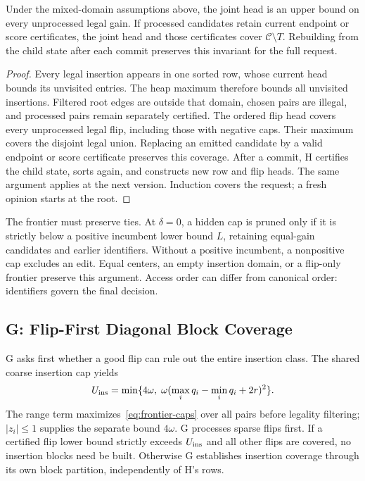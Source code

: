 \begin{theorem}\label{thm:coverage}
Under the mixed-domain assumptions above, the joint head is an upper bound on every unprocessed legal gain. If processed candidates retain current endpoint or score certificates, the joint head and those certificates cover $\mathcal C\setminus T$. Rebuilding from the child state after each commit preserves this invariant for the full request.
\end{theorem}
\begin{proof}
Every legal insertion appears in one sorted row, whose current head bounds its unvisited entries. The heap maximum therefore bounds all unvisited insertions. Filtered root edges are outside that domain, chosen pairs are illegal, and processed pairs remain separately certified. The ordered flip head covers every unprocessed legal flip, including those with negative caps. Their maximum covers the disjoint legal union. Replacing an emitted candidate by a valid endpoint or score certificate preserves this coverage. After a commit, H certifies the child state, sorts again, and constructs new row and flip heads. The same argument applies at the next version. Induction covers the request; a fresh opinion starts at the root.
\end{proof}

The frontier must preserve ties. At $\delta=0$, a hidden cap is pruned only if it is strictly below a positive incumbent lower bound $L$, retaining equal-gain candidates and earlier identifiers. Without a positive incumbent, a nonpositive cap excludes an edit. Equal centers, an empty insertion domain, or a flip-only frontier preserve this argument. Access order can differ from canonical order: identifiers govern the final decision.

\subsection{G: Flip-First Diagonal Block Coverage}
G asks first whether a good flip can rule out the entire insertion class. The shared coarse insertion cap yields
\begin{equation}
 U_{\rm ins}=\min\{4\omega,\;\omega(\max_iq_i-\min_iq_i+2r)^2\}.
 \label{eq:global-insertion}
\end{equation}
The range term maximizes~\eqref{eq:frontier-caps} over all pairs before legality filtering; $|z_i|\le1$ supplies the separate bound $4\omega$. G processes sparse flips first. If a certified flip lower bound strictly exceeds $U_{\rm ins}$ and all other flips are covered, no insertion blocks need be built. Otherwise G establishes insertion coverage through its own block partition, independently of H's rows.

